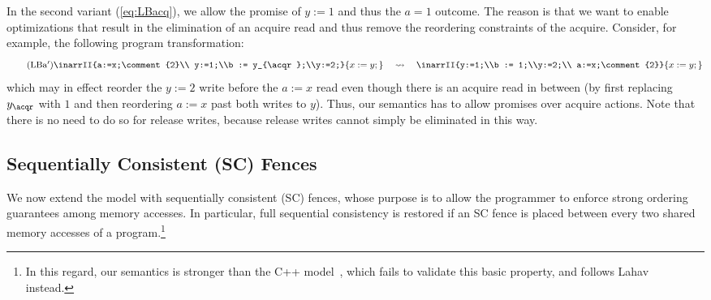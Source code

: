 In the second variant (\ref{eq:LBacq}), we allow the promise of $y:=1$ and thus the $a=1$ outcome.
The reason is that we want to enable optimizations that 
result in the elimination of an acquire read and thus remove the reordering constraints of the acquire.
Consider, for example, the following program transformation:
\begin{equation}\label{eq:acq_merge}\tag{LBa$'$}
\inarrII{a:=x;\comment{2}\\ y:=1;\\b := y_{\acqr};\\y:=2;}{x:=y;} \quad \leadsto \quad
\inarrII{y:=1;\\b := 1;\\y:=2;\\ a:=x;\comment{2}}{x:=y;}
\end{equation}
which may in effect reorder the $y:=2$ write before the $a:=x$ read even though there is an acquire read in between
(by first replacing $y_{\acqr}$ with $1$ and then reordering $a:=x$ past both writes to $y$).
Thus, our semantics has to allow promises over acquire actions.
Note that there is no need to do so for release writes, because release writes cannot simply be eliminated in this way.



\subsection{Sequentially Consistent (SC) Fences}
\label{sec:sc}

We now extend the model with sequentially consistent (SC) fences, 
whose purpose is to allow the programmer
to enforce strong ordering guarantees among memory accesses. 
In particular, full
sequential consistency is restored if an SC fence is  
placed between every two shared memory accesses of
a program.\footnote{In this regard, our semantics is stronger than the C++ model~\cite{Batty:2011},
which fails to validate this basic property, and follows Lahav~\etal~\cite{sra,repairing-sc} instead.} 

